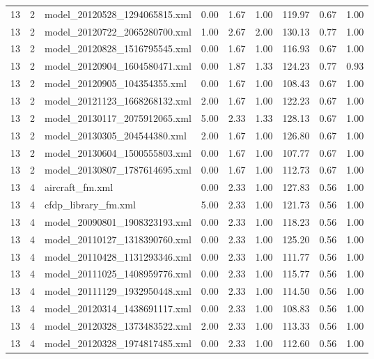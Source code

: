 \begin{table}[ht]
\begin{tabular}{rrlrrrrrr}
   13 &   2 & model\_20120528\_1294065815.xml & 0.00 & 1.67 & 1.00 & 119.97 & 0.67 & 1.00 \\ 
   13 &   2 & model\_20120722\_2065280700.xml & 1.00 & 2.67 & 2.00 & 130.13 & 0.77 & 1.00 \\ 
   13 &   2 & model\_20120828\_1516795545.xml & 0.00 & 1.67 & 1.00 & 116.93 & 0.67 & 1.00 \\ 
   13 &   2 & model\_20120904\_1604580471.xml & 0.00 & 1.87 & 1.33 & 124.23 & 0.77 & 0.93 \\ 
   13 &   2 & model\_20120905\_104354355.xml & 0.00 & 1.67 & 1.00 & 108.43 & 0.67 & 1.00 \\ 
   13 &   2 & model\_20121123\_1668268132.xml & 2.00 & 1.67 & 1.00 & 122.23 & 0.67 & 1.00 \\ 
   13 &   2 & model\_20130117\_2075912065.xml & 5.00 & 2.33 & 1.33 & 128.13 & 0.67 & 1.00 \\ 
   13 &   2 & model\_20130305\_204544380.xml & 2.00 & 1.67 & 1.00 & 126.80 & 0.67 & 1.00 \\ 
   13 &   2 & model\_20130604\_1500555803.xml & 0.00 & 1.67 & 1.00 & 107.77 & 0.67 & 1.00 \\ 
   13 &   2 & model\_20130807\_1787614695.xml & 0.00 & 1.67 & 1.00 & 112.73 & 0.67 & 1.00 \\ 
   13 &   4 & aircraft\_fm.xml & 0.00 & 2.33 & 1.00 & 127.83 & 0.56 & 1.00 \\ 
   13 &   4 & cfdp\_library\_fm.xml & 5.00 & 2.33 & 1.00 & 121.73 & 0.56 & 1.00 \\ 
   13 &   4 & model\_20090801\_1908323193.xml & 0.00 & 2.33 & 1.00 & 118.23 & 0.56 & 1.00 \\ 
   13 &   4 & model\_20110127\_1318390760.xml & 0.00 & 2.33 & 1.00 & 125.20 & 0.56 & 1.00 \\ 
   13 &   4 & model\_20110428\_1131293346.xml & 0.00 & 2.33 & 1.00 & 111.77 & 0.56 & 1.00 \\ 
   13 &   4 & model\_20111025\_1408959776.xml & 0.00 & 2.33 & 1.00 & 115.77 & 0.56 & 1.00 \\ 
   13 &   4 & model\_20111129\_1932950448.xml & 0.00 & 2.33 & 1.00 & 114.50 & 0.56 & 1.00 \\ 
   13 &   4 & model\_20120314\_1438691117.xml & 0.00 & 2.33 & 1.00 & 108.83 & 0.56 & 1.00 \\ 
   13 &   4 & model\_20120328\_1373483522.xml & 2.00 & 2.33 & 1.00 & 113.33 & 0.56 & 1.00 \\ 
   13 &   4 & model\_20120328\_1974817485.xml & 0.00 & 2.33 & 1.00 & 112.60 & 0.56 & 1.00 \\ 

\end{tabular}
\end{table}
